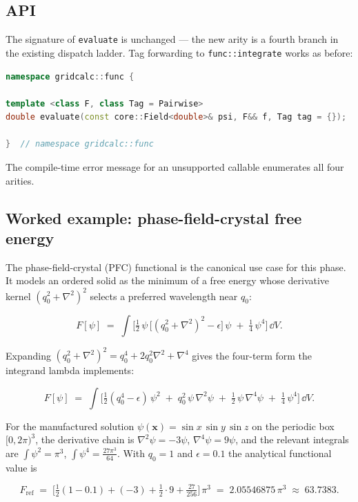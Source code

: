 \subsection{API}\label{phase11-api}

The signature of \passthrough{\lstinline!evaluate!} is unchanged --- the
new arity is a fourth branch in the existing dispatch ladder. Tag
forwarding to \passthrough{\lstinline!func::integrate!} works as before:

\begin{lstlisting}[language={C++}]
namespace gridcalc::func {

template <class F, class Tag = Pairwise>
double evaluate(const core::Field<double>& psi, F&& f, Tag tag = {});

}  // namespace gridcalc::func
\end{lstlisting}

The compile-time error message for an unsupported callable enumerates
all four arities.

\subsection{Worked example: phase-field-crystal free
energy}\label{phase11-pfc}

The phase-field-crystal (PFC) functional is the canonical use case for
this phase. It models an ordered solid as the minimum of a free
energy whose derivative kernel \((q_0^2 + \nabla^2)^2\) selects a
preferred wavelength near \(q_0\):

\[
F[\psi] \;=\; \int \Big[\tfrac{1}{2}\,\psi\,\big[(q_0^2 + \nabla^2)^2 - \epsilon\big]\,\psi \;+\; \tfrac{1}{4}\,\psi^4\Big]\,\dd V.
\]

Expanding \((q_0^2 + \nabla^2)^2 = q_0^4 + 2q_0^2\nabla^2 + \nabla^4\)
gives the four-term form the integrand lambda implements:

\[
F[\psi] \;=\; \int \Big[\tfrac{1}{2}(q_0^4 - \epsilon)\,\psi^2 \;+\; q_0^2\,\psi\,\nabla^2\psi \;+\; \tfrac{1}{2}\,\psi\,\nabla^4\psi \;+\; \tfrac{1}{4}\,\psi^4\Big]\,\dd V.
\]

For the manufactured solution \(\psi(\mathbf{x}) = \sin x\,\sin y\,\sin z\)
on the periodic box \([0, 2\pi)^3\), the derivative chain is
\(\nabla^2\psi = -3\psi\), \(\nabla^4\psi = 9\psi\), and the relevant
integrals are
\(\int\psi^2 = \pi^3\), \(\int\psi^4 = \tfrac{27\pi^3}{64}\).
With \(q_0 = 1\) and \(\epsilon = 0.1\) the analytical functional value is

\[
F_{\text{ref}} \;=\; \Big[\tfrac{1}{2}(1 - 0.1) + (-3) + \tfrac{1}{2}\cdot 9 + \tfrac{27}{256}\Big]\,\pi^3 \;=\; 2.05546875\,\pi^3 \;\approx\; 63.7383.
\]

